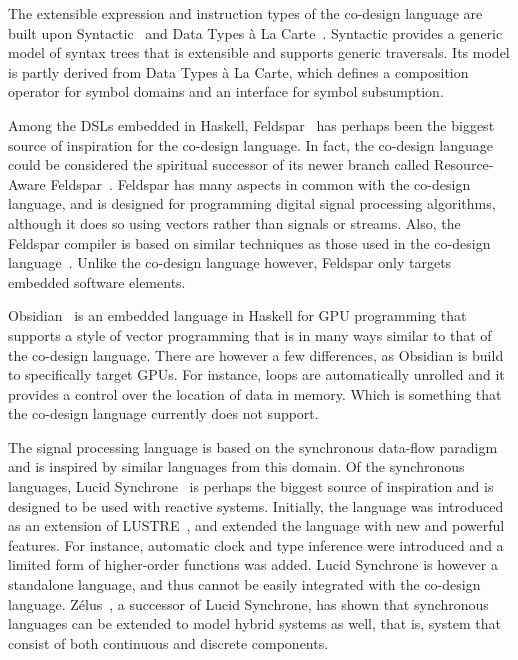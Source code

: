 \documentclass[../paper.tex]{subfiles}
\begin{document}
The extensible expression and instruction types of the co-design language are built upon Syntactic~\cite{axelsson2012} and Data Types \`{a} La Carte~\cite{DTC}. Syntactic provides a generic model of syntax trees that is extensible and supports generic traversals. Its model is partly derived from Data Types \`{a} La Carte, which defines a composition operator for symbol domains and an interface for symbol subsumption.

Among the DSLs embedded in Haskell, Feldspar~\cite{axelsson2010, axelsson2010-2} has perhaps been the biggest source of inspiration for the co-design language. In fact, the co-design language could be considered the spiritual successor of its newer branch called Resource-Aware Feldspar~\cite{raw-feldspar}. Feldspar has many aspects in common with the co-design language, and is designed for programming digital signal processing algorithms, although it does so using vectors rather than signals or streams. Also, the Feldspar compiler is based on similar techniques as those used in the co-design language~\cite{axelsson2016, axelsson2015}. Unlike the co-design language however, Feldspar only targets embedded software elements.

Obsidian~\cite{svensson2008} is an embedded language in Haskell for GPU programming that supports a style of vector programming that is in many ways similar to that of the co-design language. There are however a few differences, as Obsidian is build to specifically target GPUs. For instance, loops are automatically unrolled and it provides a control over the location of data in memory. Which is something that the co-design language currently does not support.

The signal processing language is based on the synchronous data-flow paradigm and is inspired by similar languages from this domain. Of the synchronous languages, Lucid Synchrone~\cite{pouzet2006, colaco2004} is perhaps the biggest source of inspiration and is designed to be used with reactive systems. Initially, the language was introduced as an extension of LUSTRE~\cite{hu1998}, and extended the language with new and powerful features. For instance, automatic clock and type inference were introduced and a limited form of higher-order functions was added. Lucid Synchrone is however a standalone language, and thus cannot be easily integrated with the co-design language. Z{\'e}lus~\cite{zelus2013}, a successor of Lucid Synchrone, has shown that synchronous languages can be extended to model hybrid systems as well, that is, system that consist of both continuous and discrete components.
\end{document}

